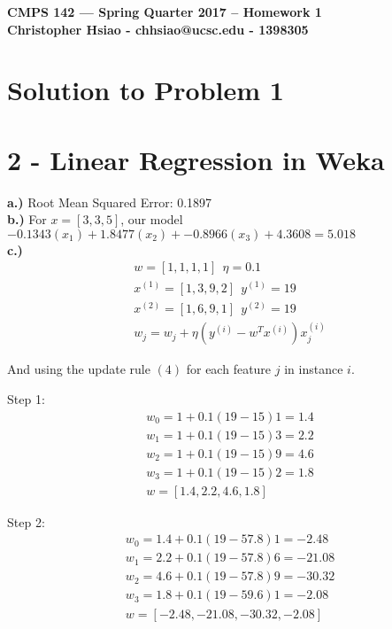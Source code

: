 \documentclass[11pt]{article}
\begin{document}
\begin{center}
{\bf\Large CMPS 142 --- Spring Quarter 2017 --  Homework 1}\\
{\bf Christopher Hsiao - chhsiao@ucsc.edu - 1398305}
\end{center}

\section*{Solution to Problem 1}

\section*{2 - Linear Regression in Weka}
\textbf{a.)} Root Mean Squared Error: 0.1897\\
\textbf{b.)} For $x = [3, 3, 5]$, our model $-0.1343(x_1) + 1.8477(x_2) + -0.8966(x_3) + 4.3608 = 5.018$\\
\textbf{c.)}
\begin{align}
w = [1, 1, 1, 1] \ \ \eta = 0.1 \\ 
x^{(1)} = [1, 3, 9, 2] \ \ y^{(1)} = 19 \\
x^{(2)} = [1, 6, 9, 1] \ \ y^{(2)} = 19 \\
w_j = w_j + \eta(y^{(i)} - w^Tx^{(i)})x^{(i)}_j
\end{align}
\begin{center}
And using the update rule $(4)$ for each feature $j$ in instance $i$.
\end{center}

Step 1: 
\begin{align*}
w_0 = 1 + 0.1(19 - 15)1 = 1.4\\
w_1 = 1 + 0.1(19 - 15)3 = 2.2\\
w_2 = 1 + 0.1(19 - 15)9 = 4.6\\
w_3 = 1 + 0.1(19 - 15)2 = 1.8\\
w = [1.4, 2.2, 4.6, 1.8]
\end{align*}

Step 2:
\begin{align*}
w_0 = 1.4 + 0.1(19 - 57.8)1 = -2.48\\
w_1 = 2.2 + 0.1(19 - 57.8)6 = -21.08\\
w_2 = 4.6 + 0.1(19 - 57.8)9 = -30.32\\
w_3 = 1.8 + 0.1(19 - 59.6)1= -2.08\\
w = [-2.48, -21.08, -30.32, -2.08]
\end{align*}
\end{document}
